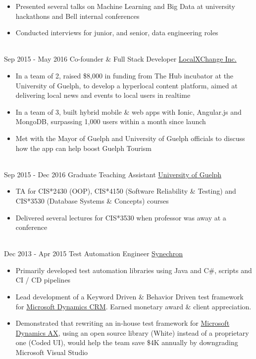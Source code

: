 \documentclass[letterpaper]{twentysecondcv} %
\begin{document}
\begin{twenty}
{\begin{itemize}
      Awards: Merit Gold (2x), Merit Platinum
    \item Presented several talks on Machine Learning and Big Data at university hackathons and Bell internal conferences
    \item Conducted interviews for junior, and senior, data engineering roles
    \end{itemize}
  }
  \\
  \twentyitem
  {Sep 2015 -}
  {May 2016}
  {Co-founder \& Full Stack Developer}
  {\href{http://www.localxchange.ca/}{LocalXChange Inc.}}
  {}
  {
    {\begin{itemize}
      \item In a team of 2, raised \$8,000 in funding from The Hub incubator at the University of Guelph, to develop a hyperlocal content platform, aimed at delivering local news and events to local users in realtime
      \item In a team of 3, built hybrid mobile \& web apps with Ionic, Angular.js and MongoDB, surpassing 1,000 users within a month since launch
      \item Met with the Mayor of Guelph and University of Guelph officials to discuss how the app can help boost Guelph Tourism 
      \end{itemize}}
  }
  \\   
  \twentyitem
  {Sep 2015 -}
  {Dec 2016}
  {Graduate Teaching Assistant}
  {\href{http://www.uoguelph.ca}{University of Guelph}}
  {}
  {
    {\begin{itemize}
      \item TA for CIS*2430 (OOP), CIS*4150 (Software Reliability \& Testing) and CIS*3530 (Database Systems \& Concepts) courses
      \item Delivered several lectures for CIS*3530 when professor was away at a conference
      \end{itemize}}
  }
  \\
  \twentyitem
  {Dec 2013 -}
  {Apr 2015}
  {Test Automation Engineer}
  {\href{http://www.synechron.com/}{Synechron}}
  {}
  {
    \begin{itemize}
    \item Primarily developed test automation libraries using Java and C\#, scripts and CI / CD pipelines
    \item Lead development of a Keyword Driven \& Behavior Driven test framework for \href{https://www.microsoft.com/en-ca/dynamics/crm.aspx}{Microsoft Dynamics CRM}. Earned monetary award \& client appreciation.
    \item Demonstrated that rewriting an in-house test framework for \href{https://www.microsoft.com/en-ca/dynamics/erp-ax-overview.aspx}{Microsoft Dynamics AX}, using an open source library (White) instead of a proprietary one (Coded UI), would help the team save \$4K annually by downgrading Microsoft Visual Studio
    \end{itemize}
  }

\end{twenty}
\end{document}
